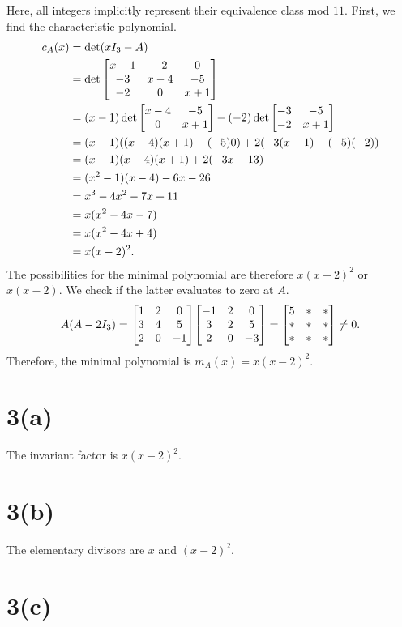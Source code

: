 \documentclass[12pt]{article}
\theoremstyle{definition}
\begin{document}
Here, all integers implicitly represent their equivalence class mod $11$. First, we find the characteristic polynomial.
\begin{align*}
    c_A(x)
        &= \det(xI_3 - A) \\
        &= \det\mqty[x - 1 & -2 & 0 \\ -3 & x - 4 & -5 \\ -2 & 0  & x + 1] \\
        &= (x-1)\det\mqty[x - 4 & -5 \\ 0 & x + 1] - (-2)\det\mqty[-3 & -5 \\ -2 & x + 1] \\
        &= (x-1)((x-4)(x+1) - (-5)0) + 2(-3(x+1) - (-5)(-2)) \\
        &= (x-1)(x-4)(x+1) + 2(-3x - 13) \\
        &= (x^2 - 1)(x - 4) - 6x - 26 \\
        &= x^3 - 4x^2 - 7x + 11 \\
        &= x(x^2 - 4x - 7) \\
        &= x(x^2 - 4x + 4) \\
        &= x(x - 2)^2.
\end{align*}
The possibilities for the minimal polynomial are therefore $x(x - 2)^2$ or $x(x - 2)$. We check if the latter evaluates to zero at $A$.
\[
    A(A - 2I_3)
        = \mqty[1 & 2 & 0 \\ 3 & 4 & 5 \\ 2 & 0 & -1]\mqty[-1 & 2 & 0 \\ 3 & 2 & 5 \\ 2 & 0 & -3] \\
        = \mqty[5 & * & * \\ * & * & * \\ * & * & *] \\
        \ne 0.
\]
Therefore, the minimal polynomial is $m_A(x) = x(x - 2)^2$.

\section*{3(a)}

The invariant factor is $x(x - 2)^2$.


\section*{3(b)}

The elementary divisors are $x$ and $(x - 2)^2$.

\section*{3(c)}
\end{document}
